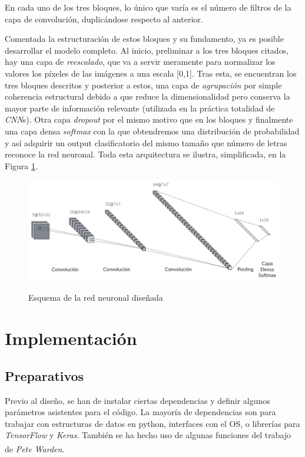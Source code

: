 En cada uno de los tres bloques, lo único que varía es el número de filtros de
la capa de convolución, duplicándose respecto al anterior.

Comentada la estructuración de estos bloques y su fundamento, ya es posible
desarrollar el modelo completo.
Al inicio, preliminar a los tres bloques citados, hay una capa de \textit{reescalado},
que va a servir meramente para normalizar los valores los píxeles de las imágenes
a una escala [0,1].
Tras esta, se encuentran los tres bloques descritos y posterior a estos,
una capa de \textit{agrupación} por simple
coherencia estructural debido a que reduce la dimensionalidad pero conserva la mayor
parte de información relevante (utilizada en la práctica totalidad de \textit{CNN}s).
Otra capa \textit{dropout} por el mismo motivo que en los
bloques y finalmente una capa densa \textit{softmax} con la que obtendremos una distribución
de probabilidad y así adquirir un output clasificatorio del mismo tamaño que número de letras
reconoce la red neuronal. Toda esta arquitectura se ilustra, simplificada, en la Figura \ref{esqRN}.

\begin{figure}[h]
    \centering
    \includegraphics[width=1\textwidth]{capturas/esquemaRN.png}\\[-0,40cm]
    \caption{Esquema de la red neuronal diseñada \label{esqRN}}
\end{figure}

\section{Implementación}
\subsection{Preparativos}
Previo al diseño, se han de instalar ciertas dependencias y definir
algunos parámetros asistentes para el código. La mayoría de dependencias
son para trabajar con estructuras de datos en python, interfaces con el OS, o
librerías para \textit{TensorFlow} y \textit{Keras}.
También se ha hecho uso de algunas funciones del trabajo de
\textit{Pete Warden}\textsuperscript{\cite{petewardenmw}}.


